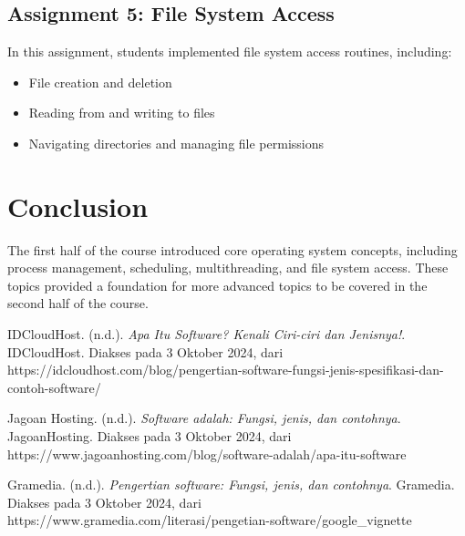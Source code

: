 \documentclass[12pt]{article}
\begin{document}
\subsection{Assignment 5: File System Access}
In this assignment, students implemented file system access routines, including:
\begin{itemize}
    \item File creation and deletion
    \item Reading from and writing to files
    \item Navigating directories and managing file permissions
\end{itemize}

\section{Conclusion}
The first half of the course introduced core operating system concepts, including process management, scheduling, multithreading, and file system access. These topics provided a foundation for more advanced topics to be covered in the second half of the course.

\begin{thebibliography}{3}
    IDCloudHost. (n.d.). \textit{Apa Itu Software? Kenali Ciri-ciri dan Jenisnya!}. IDCloudHost. Diakses pada 3 Oktober 2024, dari https://idcloudhost.com/blog/pengertian-software-fungsi-jenis-spesifikasi-dan-contoh-software/

    Jagoan Hosting. (n.d.). \textit{Software adalah: Fungsi, jenis, dan contohnya}. JagoanHosting. Diakses pada 3 Oktober 2024, dari https://www.jagoanhosting.com/blog/software-adalah/apa-itu-software

    Gramedia. (n.d.). \textit{Pengertian software: Fungsi, jenis, dan contohnya}. Gramedia. Diakses pada 3 Oktober 2024, dari https://www.gramedia.com/literasi/pengetian-software/google\_vignette
\end{thebibliography}
\end{document}
